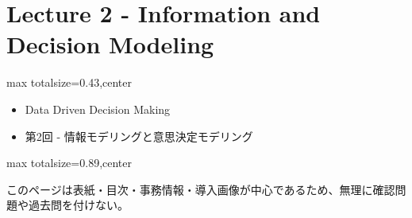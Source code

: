\section*{Lecture 2 - Information and Decision Modeling}

\clearpage
{}
\begin{minipage}[t]{0.405\textwidth}
\begin{adjustbox}{max totalsize={\textwidth}{0.43\textheight},center}
\begin{minipage}{\textwidth}\scriptsize
{}\begin{itemize}
\item Data Driven Decision Making
\item 第2回 - 情報モデリングと意思決定モデリング
\end{itemize}
\end{minipage}
\end{adjustbox}
\end{minipage}\hfill
\begin{minipage}[t]{0.58\textwidth}
\begin{adjustbox}{max totalsize={\textwidth}{0.89\textheight},center}
\begin{minipage}{\textwidth}\scriptsize
{}このページは表紙・目次・事務情報・導入画像が中心であるため、無理に確認問題や過去問を付けない。
\end{minipage}
\end{adjustbox}
\end{minipage}


